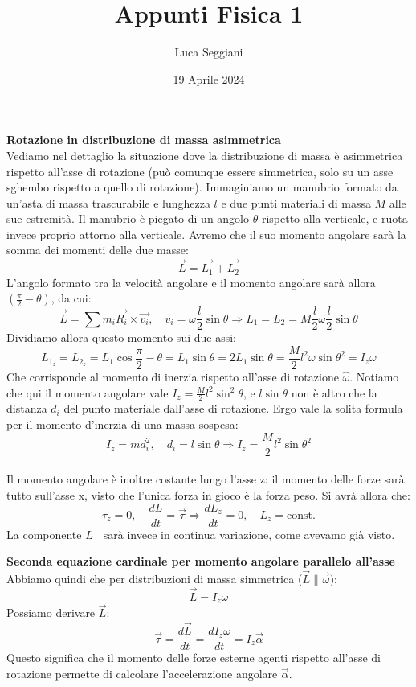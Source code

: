 \documentclass[a4paper,12pt]{article}
\title{Appunti Fisica 1}
\author{Luca Seggiani}
\date{19 Aprile 2024}
\begin{document}
\maketitle
\par\smallskip
\textbf{Rotazione in distribuzione di massa asimmetrica} \\
Vediamo nel dettaglio la situazione dove la distribuzione di massa è asimmetrica rispetto all'asse di rotazione (può
comunque essere simmetrica, solo su un asse sghembo rispetto a quello di rotazione). Immaginiamo un manubrio formato da un'asta
di massa trascurabile e lunghezza $l$ e due punti materiali di massa $M$ alle sue estremità. Il manubrio è piegato di un angolo
$\theta$ rispetto alla verticale, e ruota invece proprio attorno alla verticale. Avremo che il suo momento angolare sarà la somma
dei momenti delle due masse:
$$ \vec{L} = \vec{L_1} + \vec{L_2} $$
L'angolo formato tra la velocità angolare e il momento angolare sarà allora $(\frac{\pi}{2} - \theta)$, da cui:
$$ \vec{L} = \sum m_i\vec{R_i} \times \vec{v_i}, \quad v_i = \omega \frac{l}{2} \sin{\theta} \Rightarrow L_1 = L_2 = M \frac{l}{2} \omega \frac{l}{2} \sin{\theta} $$
Dividiamo allora questo momento sui due assi:
$$ L_{1_z} = L_{2_z} = L_1\cos{\frac{\pi}{2} - \theta} = L_1\sin{\theta} = 2L_1\sin{\theta} = \frac{M}{2} l^2 \omega \sin{\theta}^2 = I_z\omega$$
Che corrisponde al momento di inerzia rispetto all'asse di rotazione $\hat{\omega}$. Notiamo che qui il momento angolare vale $I_z = \frac{M}{2} l^2 \sin^2{\theta}$,
e $l\sin{\theta}$ non è altro che la distanza $d_i$ del punto materiale dall'asse di rotazione. Ergo vale la solita formula per il momento d'inerzia di una massa sospesa:
$$ I_z = md_i^2, \quad d_i = l\sin{\theta} \Rightarrow I_z = \frac{M}{2}l^2\sin{\theta}^2 $$
\\ Il momento angolare è inoltre costante lungo l'asse z: il momento delle forze sarà tutto sull'asse x, visto che l'unica forza in gioco è la forza peso.
Si avrà allora che:
$$ \tau_z = 0, \quad \frac{dL}{dt} = \vec{\tau} \Rightarrow \frac{dL_z}{dt} = 0, \quad L_z = \mathrm{const.}$$
La componente $L_\perp$ sarà invece in continua variazione, come avevamo già visto.
\par\smallskip
\textbf{Seconda equazione cardinale per momento angolare parallelo all'asse} \\
Abbiamo quindi che per distribuzioni di massa simmetrica ($\vec{L} \parallel \vec{\omega})$:
$$ \vec{L} = I_z\omega $$
Possiamo derivare $\vec{L}$:
$$ \vec{\tau} = \frac{d\vec{L}}{dt} = \frac{dI_z\omega}{dt} = I_z\vec{\alpha} $$
Questo significa che il momento delle forze esterne agenti rispetto all'asse di rotazione permette di calcolare l'accelerazione
angolare $\vec{\alpha}$.
\end{document}

